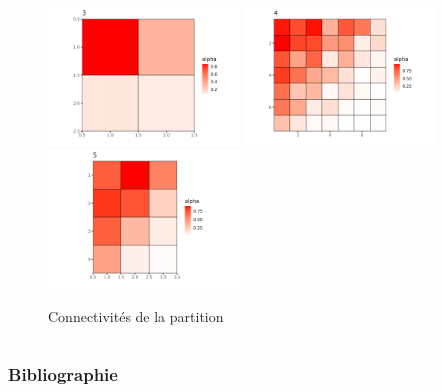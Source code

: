 \documentclass{beamer}
\begin{document}
\begin{frame}
\begin{columns}
\begin{column}{0.48\linewidth}
\begin{figure}[H]
                    \includegraphics[width=0.45\textwidth]{img/iid-meso-3.png}
                    \includegraphics[width=0.45\textwidth]{img/iid-meso-4.png}
                    \includegraphics[width=0.45\textwidth]{img/iid-meso-5.png}
                \caption{Connectivités de la partition}
            \end{figure}
        \end{column}
    \end{columns}
\end{frame}

\begin{frame}
    \frametitle{Bibliographie}
    \hfill
    \begin{minipage}{0.9\textwidth}
        \printbibliography
    \end{minipage}
\end{frame}
\end{document}
